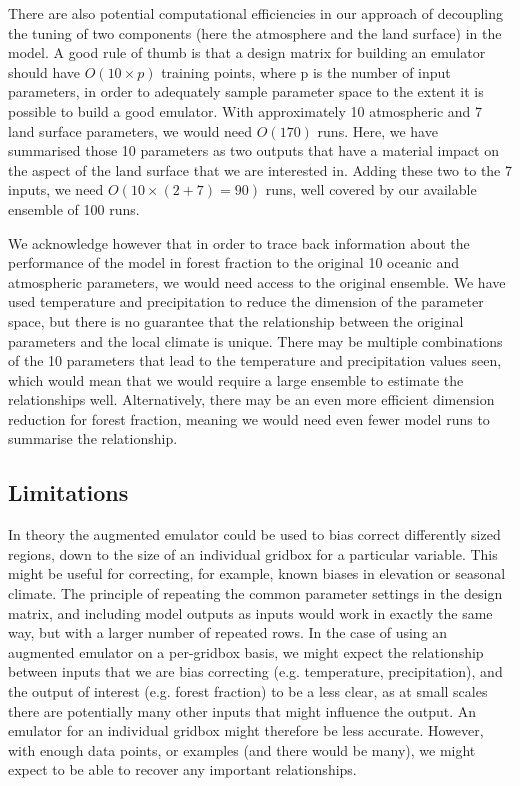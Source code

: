 \documentclass[gmd, manuscript]{copernicus}
\begin{document}
There are also potential computational efficiencies in our approach of decoupling the tuning of two components (here the atmosphere and the land surface) in the model. A good rule of thumb is that a design matrix for building an emulator should have $O(10 \times p)$ training points, where p is the number of input parameters, in order to adequately sample parameter space to the extent it is possible to build a good emulator. With approximately 10 atmospheric and 7 land surface parameters, we would need $O(170)$ runs. Here, we have summarised those 10 parameters as two outputs that have a material impact on the aspect of the land surface that we are interested in. Adding these two to the 7 inputs, we need $O(10 \times (2+7) = 90)$ runs, well covered by our available ensemble of 100 runs.

 We acknowledge however that in order to trace back information about the performance of the model in forest fraction to the original 10 oceanic and atmospheric parameters, we would need access to the original ensemble. We have used temperature and precipitation to reduce the dimension of the parameter space, but there is no guarantee that the relationship between the original parameters and the local climate is unique. There may be multiple combinations of the 10 parameters that lead to the temperature and precipitation values seen, which would mean that we would require a large ensemble to estimate the relationships well. Alternatively, there may be an even more efficient dimension reduction for forest fraction, meaning we would need even fewer model runs to summarise the relationship.


\subsection{Limitations}\label{ssec:limitations}

In theory the augmented emulator could be used to bias correct differently sized regions, down to the size of an individual gridbox for a particular variable. This might be useful for correcting, for example, known biases in elevation or seasonal climate. The principle of repeating the common parameter settings in the design matrix, and including model outputs as inputs would work in exactly the same way, but with a larger number of repeated rows. In the case of using an augmented emulator on a per-gridbox basis, we might expect the relationship between inputs that we are bias correcting (e.g. temperature, precipitation), and the output of interest (e.g. forest fraction) to be a less clear, as at small scales there are potentially many other inputs that might influence the output. An emulator for an individual gridbox might therefore be less accurate. However, with enough data points, or examples (and there would be many), we might expect to be able to recover any important relationships.
\end{document}
